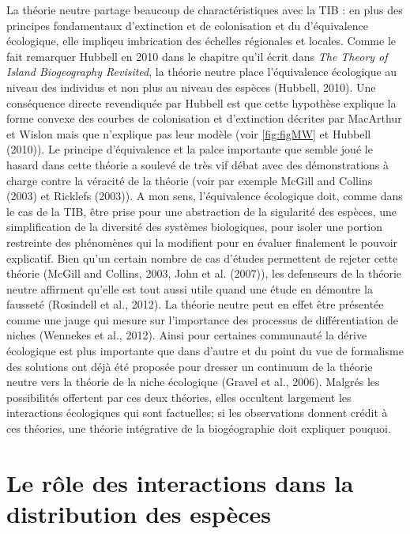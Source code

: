 La théorie neutre partage beaucoup de charactéristiques avec la TIB : en
plus des principes fondamentaux d'extinction et de colonisation et du
d'équivalence écologique, elle impliqeu imbrication des échelles
régionales et locales. Comme le fait remarquer Hubbell en 2010 dans le
chapitre qu'il écrit dans \emph{The Theory of Island Biogeography
Revisited}, la théorie neutre place l'équivalence écologique au niveau
des individus et non plus au niveau des espèces (Hubbell, 2010). Une
conséquence directe revendiquée par Hubbell est que cette hypothèse
explique la forme convexe des courbes de colonisation et d'extinction
décrites par MacArthur et Wislon mais que n'explique pas leur modèle
(voir \protect\renewcommand{\plusnamesingular}{fig.}\cref{fig:figMW} et
Hubbell (2010)). Le principe d'équivalence et la palce importante que
semble joué le hasard dans cette théorie a soulevé de très vif débat
avec des démonstrations à charge contre la véracité de la théorie (voir
par exemple McGill and Collins (2003) et Ricklefs (2003)). A mon sens,
l'équivalence écologique doit, comme dans le cas de la TIB, être prise
pour une abstraction de la sigularité des espèces, une simplification de
la diversité des systèmes biologiques, pour isoler une portion
restreinte des phénomènes qui la modifient pour en évaluer finalement le
pouvoir explicatif. Bien qu'un certain nombre de cas d'études permettent
de rejeter cette théorie (McGill and Collins, 2003, John et al. (2007)),
les defenseurs de la théorie neutre affirment qu'elle est tout aussi
utile quand une étude en démontre la fausseté (Rosindell et al., 2012).
La théorie neutre peut en effet être présentée comme une jauge qui
mesure sur l'importance des processus de différentiation de niches
(Wennekes et al., 2012). Ainsi pour certaines communauté la dérive
écologique est plus importante que dans d'autre et du point du vue de
formalisme des solutions ont déjà été proposée pour dresser un continuum
de la théorie neutre vers la théorie de la niche écologique (Gravel et
al., 2006). Malgrés les possibilités offertent par ces deux théories,
elles occultent largement les interactions écologiques qui sont
factuelles; si les observations donnent crédit à ces théories, une
théorie intégrative de la biogéographie doit expliquer pouquoi.

\section*{Le rôle des interactions dans la distribution des
espèces}\label{le-ruxf4le-des-interactions-dans-la-distribution-des-espuxe8ces}


